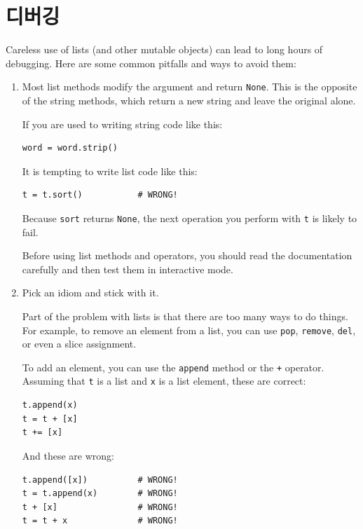 \documentclass[10pt]{book}
\begin{document}
\section{디버깅}

Careless use of lists (and other mutable objects)
can lead to long hours of debugging.  Here are some common
pitfalls and ways to avoid them:

\begin{enumerate}

\item Most list methods modify the argument and
  return {\tt None}.  This is the opposite of the string methods,
  which return a new string and leave the original alone.

If you are used to writing string code like this:

\begin{verbatim}
word = word.strip()
\end{verbatim}

It is tempting to write list code like this:

\begin{verbatim}
t = t.sort()           # WRONG!
\end{verbatim}

Because {\tt sort} returns {\tt None}, the
next operation you perform with {\tt t} is likely to fail.

Before using list methods and operators, you should read the
documentation carefully and then test them in interactive mode.

\item Pick an idiom and stick with it.

Part of the problem with lists is that there are too many
ways to do things.  For example, to remove an element from
a list, you can use {\tt pop}, {\tt remove}, {\tt del},
or even a slice assignment.

To add an element, you can use the {\tt append} method or
the {\tt +} operator.  Assuming that {\tt t} is a list and
{\tt x} is a list element, these are correct: 

\begin{verbatim}
t.append(x)
t = t + [x]
t += [x]
\end{verbatim}

And these are wrong:

\begin{verbatim}
t.append([x])          # WRONG!
t = t.append(x)        # WRONG!
t + [x]                # WRONG!
t = t + x              # WRONG!
\end{verbatim}


\end{enumerate}
\end{document}
